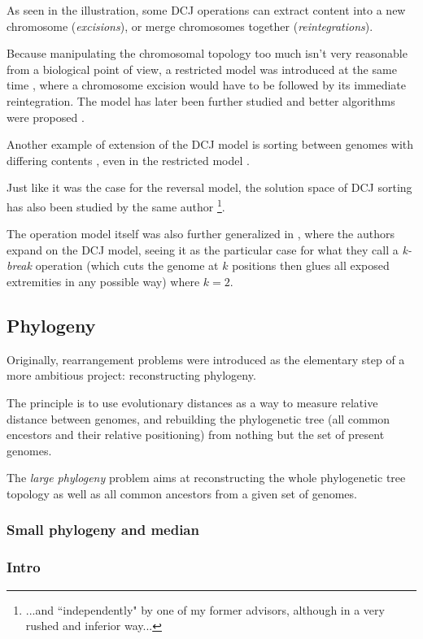 \documentclass[11pt,final,twoside,nofrench]{thlifl}
\begin{document}
As seen in the illustration, some DCJ operations can extract content into a new chromosome (\emph{excisions}), or merge chromosomes together (\emph{reintegrations}).

Because manipulating the chromosomal topology too much isn't very reasonable from a biological point of view, a restricted model was introduced at the same time \cite{Yancopoulos05}, where a chromosome excision would have to be followed by its immediate reintegration. The model has later been further studied and better algorithms were proposed \cite{Kovac10} \cite{Kovac}.

Another example of extension of the DCJ model is sorting between genomes with differing contents \cite{YF08} \cite{BWS10}, even in the restricted model \cite{Br13}.

Just like it was the case for the reversal model, the solution space of DCJ sorting has also been studied by the same author \cite{BS10}\footnote{...and ``independently" by one of my former advisors, although in a very rushed and inferior way...}.

The operation model itself was also further generalized in \cite{A08}, where the authors expand on the DCJ model, seeing it as the particular case for what they call a \emph{k-break} operation (which cuts the genome at $k$ positions then glues all exposed extremities in any possible way) where $k=2$.

\subsection{Phylogeny}

Originally, rearrangement problems were introduced as the elementary step of a more ambitious project: reconstructing phylogeny.

The principle is to use evolutionary distances as a way to measure relative distance between genomes, and rebuilding the phylogenetic tree (all common encestors and their relative positioning) from nothing but the set of present genomes.

The \emph{large phylogeny} problem aims at reconstructing the whole phylogenetic tree topology as well as all common ancestors from a given set of genomes.

\subsubsection{Small phylogeny and median}

\subsubsection*{Intro}
\end{document}
